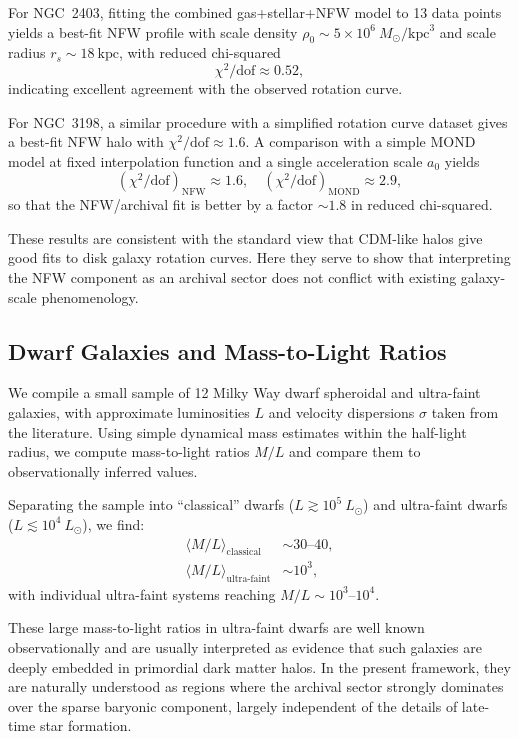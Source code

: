 \documentclass[11pt,a4paper]{article}
\begin{document}
For NGC~2403, fitting the combined gas+stellar+NFW model to 13 data points yields a best-fit NFW profile with scale density $\rho_0 \sim 5\times 10^6~M_\odot/\mathrm{kpc}^3$ and scale radius $r_s \sim 18~\mathrm{kpc}$, with reduced chi-squared
\begin{equation}
\chi^2/\mathrm{dof} \approx 0.52,
\end{equation}
indicating excellent agreement with the observed rotation curve.

For NGC~3198, a similar procedure with a simplified rotation curve dataset gives a best-fit NFW halo with $\chi^2/\mathrm{dof} \approx 1.6$. A comparison with a simple MOND model at fixed interpolation function and a single acceleration scale $a_0$ yields
\begin{equation}
(\chi^2/\mathrm{dof})_{\mathrm{NFW}} \approx 1.6, \quad
(\chi^2/\mathrm{dof})_{\mathrm{MOND}} \approx 2.9,
\end{equation}
so that the NFW/archival fit is better by a factor $\sim 1.8$ in reduced chi-squared.

These results are consistent with the standard view that CDM-like halos give good fits to disk galaxy rotation curves. Here they serve to show that interpreting the NFW component as an archival sector does not conflict with existing galaxy-scale phenomenology.

\subsection{Dwarf Galaxies and Mass-to-Light Ratios}

We compile a small sample of 12 Milky Way dwarf spheroidal and ultra-faint galaxies, with approximate luminosities $L$ and velocity dispersions $\sigma$ taken from the literature. Using simple dynamical mass estimates within the half-light radius, we compute mass-to-light ratios $M/L$ and compare them to observationally inferred values.

Separating the sample into ``classical'' dwarfs ($L \gtrsim 10^5~L_\odot$) and ultra-faint dwarfs ($L \lesssim 10^4~L_\odot$), we find:
\begin{align}
\langle M/L \rangle_{\mathrm{classical}} &\sim 30\text{--}40, \\
\langle M/L \rangle_{\mathrm{ultra\text{-}faint}} &\sim 10^3,
\end{align}
with individual ultra-faint systems reaching $M/L \sim 10^3$--$10^4$.

These large mass-to-light ratios in ultra-faint dwarfs are well known observationally and are usually interpreted as evidence that such galaxies are deeply embedded in primordial dark matter halos. In the present framework, they are naturally understood as regions where the archival sector strongly dominates over the sparse baryonic component, largely independent of the details of late-time star formation.
\end{document}
